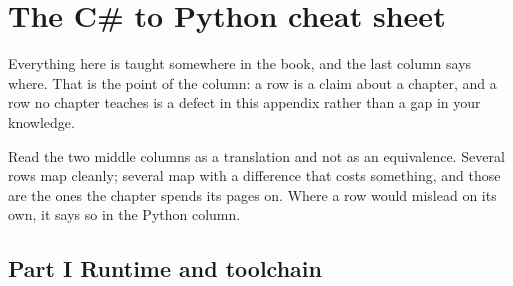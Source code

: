 
\chapter{The C\# to Python cheat sheet}
\label{app:cheatsheet}

\noindent
Everything here is taught somewhere in the book, and the last column says
where. That is the point of the column: a row is a claim about a chapter,
and a row no chapter teaches is a defect in this appendix rather than a
gap in your knowledge.

Read the two middle columns as a translation and not as an equivalence.
Several rows map cleanly; several map with a difference that costs
something, and those are the ones the chapter spends its pages on. Where a
row would mislead on its own, it says so in the Python column.

\section{Part I \dash{} Runtime and toolchain}
\label{sec:appA-part1}


